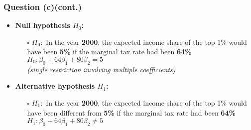 \documentclass[11pt, xcolor=x11names,compress]{beamer}
\begin{document}
\begin{frame}
\frametitle{Question (c)(cont.)}
\begin{itemize}
    \item \textbf{Null hypothesis $H_0$:} 
    \begin{itemize}
        \item[$\square$] $H_0:$ In the year \textbf{2000}, the expected income share of the top 1\% would have been \textbf{5\%} if the marginal tax rate had been \textbf{64\%}\\
        \vspace{2mm}
        $H_0: \beta_0 + 64 \beta_1 + 80 \beta_2 = 5$\\
        \vspace{2mm}
        \textit{(single restriction involving multiple coefficients)}
    \end{itemize}
    \vspace{3mm}
    \item \textbf{Alternative hypothesis $H_1$:}
    \begin{itemize}
        \item[$\square$] $H_1:$ In the year \textbf{2000}, the expected income share of the top 1\% would have been different from \textbf{5\%} if the marginal tax rate had been \textbf{64\%}\\
        \vspace{2mm}
        $H_1: \beta_0 + 64 \beta_1 + 80 \beta_2 \neq 5$
    \end{itemize}
\end{itemize}
\end{frame}
\end{document}
